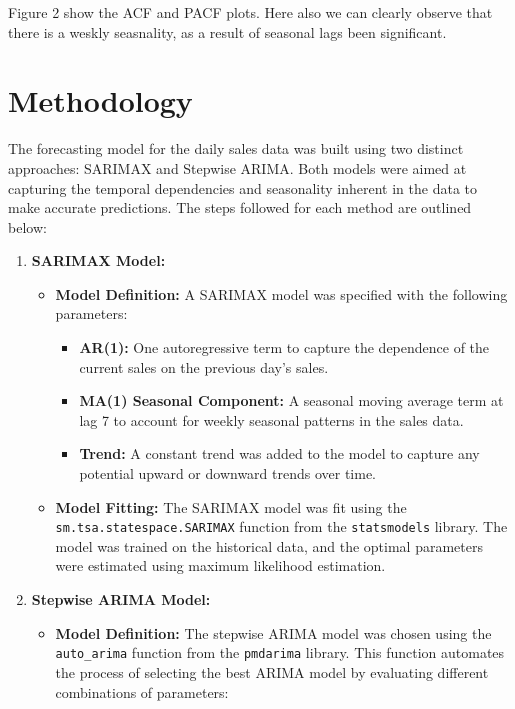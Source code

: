 \documentclass[
  a4paper,
  DIV=11,
  numbers=noendperiod]{scrartcl}
\providecommand{\tightlist}{%
  \setlength{\itemsep}{0pt}\setlength{\parskip}{0pt}}\usepackage{longtable,booktabs,array}
\begin{document}
Figure 2 show the ACF and PACF plots. Here also we can clearly observe
that there is a weskly seasnality, as a result of seasonal lags been
significant.

\section{Methodology}\label{methodology}

The forecasting model for the daily sales data was built using two
distinct approaches: SARIMAX and Stepwise ARIMA. Both models were aimed
at capturing the temporal dependencies and seasonality inherent in the
data to make accurate predictions. The steps followed for each method
are outlined below:

\begin{enumerate}
\def\labelenumi{\arabic{enumi}.}
\tightlist
\item
  \textbf{SARIMAX Model:}

  \begin{itemize}
  \tightlist
  \item
    \textbf{Model Definition:} A SARIMAX model was specified with the
    following parameters:

    \begin{itemize}
    \tightlist
    \item
      \textbf{AR(1):} One autoregressive term to capture the dependence
      of the current sales on the previous day's sales.
    \item
      \textbf{MA(1) Seasonal Component:} A seasonal moving average term
      at lag 7 to account for weekly seasonal patterns in the sales
      data.
    \item
      \textbf{Trend:} A constant trend was added to the model to capture
      any potential upward or downward trends over time.
    \end{itemize}
  \item
    \textbf{Model Fitting:} The SARIMAX model was fit using the
    \texttt{sm.tsa.statespace.SARIMAX} function from the
    \texttt{statsmodels} library. The model was trained on the
    historical data, and the optimal parameters were estimated using
    maximum likelihood estimation.
  \end{itemize}
\item
  \textbf{Stepwise ARIMA Model:}

  \begin{itemize}
  \tightlist
  \item
    \textbf{Model Definition:} The stepwise ARIMA model was chosen using
    the \texttt{auto\_arima} function from the \texttt{pmdarima}
    library. This function automates the process of selecting the best
    ARIMA model by evaluating different combinations of parameters:


\end{itemize}
\end{enumerate}
\end{document}
